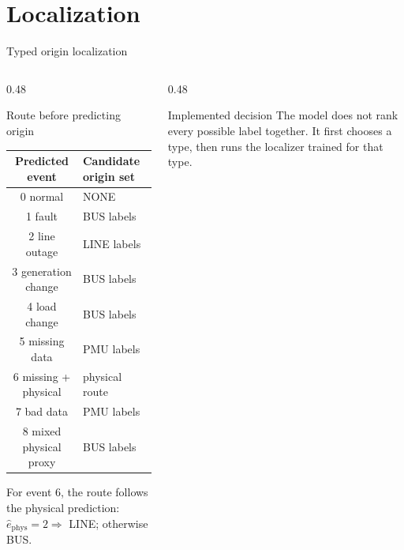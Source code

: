 ﻿\documentclass[10pt,aspectratio=169]{beamer}
\begin{document}
\section{Localization}


\begin{frame}{Typed origin localization}
\small
\begin{columns}[T,totalwidth=\textwidth]
\begin{column}{0.48\textwidth}
\begin{block}{Route before predicting origin}
\begin{tabular}{@{}cl@{}}
\toprule
Predicted event & Candidate origin set\\
\midrule
0 normal & NONE\\
1 fault & BUS labels\\
2 line outage & LINE labels\\
3 generation change & BUS labels\\
4 load change & BUS labels\\
5 missing data & PMU labels\\
6 missing + physical & physical route\\
7 bad data & PMU labels\\
8 mixed physical proxy & BUS labels\\
\bottomrule
\end{tabular}
\end{block}
\vspace{1mm}
\scriptsize
For event 6, the route follows the physical prediction:
\(\hat e_{\mathrm{phys}}=2\Rightarrow\) LINE; otherwise BUS.
\end{column}
\begin{column}{0.48\textwidth}
\begin{alertblock}{Implemented decision}
The model does not rank every possible label together. It first chooses a type, then runs the localizer trained for that type.
\end{alertblock}
\centering
{}
\end{column}
\end{columns}
\end{frame}
\end{document}
